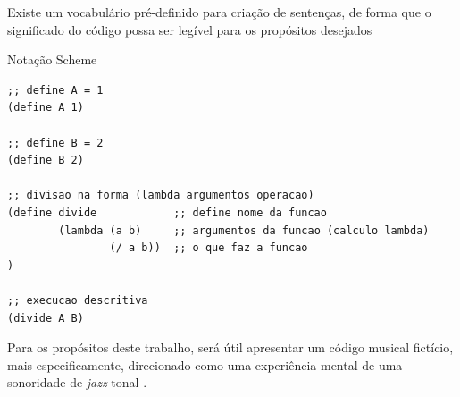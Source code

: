 Existe um vocabulário pré-definido para criação de sentenças, de forma que o significado do código possa ser legível para os propósitos desejados

\begin{example}{Notação Scheme}
\begin{verbatim}
;; define A = 1
(define A 1)

;; define B = 2
(define B 2)

;; divisao na forma (lambda argumentos operacao) 
(define divide            ;; define nome da funcao
        (lambda (a b)     ;; argumentos da funcao (calculo lambda)
                (/ a b))  ;; o que faz a funcao
)

;; execucao descritiva
(divide A B)
\end{verbatim}
\end{example}

Para os propósitos deste trabalho, será útil apresentar um código musical fictício, mais especificamente, direcionado como uma experiência mental de uma sonoridade de \emph{jazz} tonal . 

